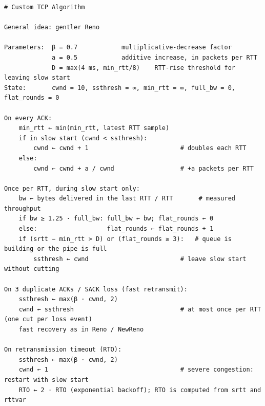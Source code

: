 \documentclass[10pt]{article}
\begin{document}
\begin{Verbatim}[fontsize=\footnotesize,frame=single]
# Custom TCP Algorithm

General idea: gentler Reno

Parameters:  β = 0.7            multiplicative-decrease factor
             a = 0.5            additive increase, in packets per RTT
             D = max(4 ms, min_rtt/8)    RTT-rise threshold for leaving slow start
State:       cwnd = 10, ssthresh = ∞, min_rtt = ∞, full_bw = 0, flat_rounds = 0

On every ACK:
    min_rtt ← min(min_rtt, latest RTT sample)
    if in slow start (cwnd < ssthresh):
        cwnd ← cwnd + 1                         # doubles each RTT
    else:
        cwnd ← cwnd + a / cwnd                  # +a packets per RTT

Once per RTT, during slow start only:
    bw ← bytes delivered in the last RTT / RTT       # measured throughput
    if bw ≥ 1.25 · full_bw: full_bw ← bw; flat_rounds ← 0
    else:                   flat_rounds ← flat_rounds + 1
    if (srtt − min_rtt > D) or (flat_rounds ≥ 3):   # queue is building or the pipe is full
        ssthresh ← cwnd                         # leave slow start without cutting

On 3 duplicate ACKs / SACK loss (fast retransmit):
    ssthresh ← max(β · cwnd, 2)
    cwnd ← ssthresh                             # at most once per RTT (one cut per loss event)
    fast recovery as in Reno / NewReno

On retransmission timeout (RTO):
    ssthresh ← max(β · cwnd, 2)
    cwnd ← 1                                    # severe congestion: restart with slow start
    RTO ← 2 · RTO (exponential backoff); RTO is computed from srtt and rttvar
\end{Verbatim}
\end{document}
